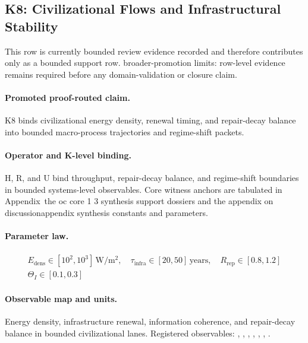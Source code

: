 \subsection{K8: Civilizational Flows and Infrastructural Stability}
\label{sec:oc-core-1-3-synthesis-k8}
This row is currently bounded review evidence recorded and therefore contributes only as a bounded support row.
broader-promotion limits: row-level evidence remains required before any domain-validation or closure claim.

\paragraph{Promoted proof-routed claim.}
K8 binds civilizational energy density, renewal timing, and repair-decay balance into bounded macro-process trajectories and regime-shift packets.

\paragraph{Operator and K-level binding.}
H, R, and U bind throughput, repair-decay balance, and regime-shift boundaries in bounded systems-level observables.
Core witness anchors are tabulated in Appendix~the oc core 1 3 synthesis support dossiers and the appendix on discussionappendix synthesis constants and parameters.

\paragraph{Parameter law.}
\[
\begin{gathered} E_{\mathrm{dens}} \in [10^2,10^3]\,\mathrm{W/m^2},\quad \tau_{\mathrm{infra}} \in [20,50]\,\mathrm{years},\quad R_{\mathrm{rep}} \in [0.8,1.2] \\ \Theta_I \in [0.1,0.3] \end{gathered}
\]

\paragraph{Observable map and units.}
Energy density, infrastructure renewal, information coherence, and repair-decay balance in bounded civilizational lanes.
Registered observables: , \allowbreak {}, \allowbreak {}, \allowbreak {}, \allowbreak {}, \allowbreak {}, \allowbreak {}.

